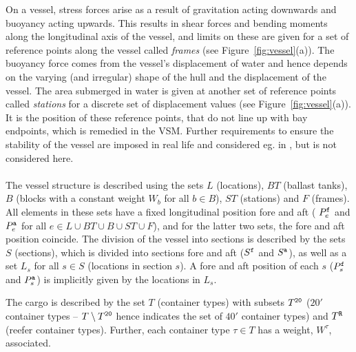 On a vessel, stress forces arise as a result of gravitation acting downwards and buoyancy acting upwards. This results in shear forces and bending moments along the longitudinal axis of the vessel, and limits on these are given for a set of reference points along the vessel called \emph{frames} (see Figure~\ref{fig:vessel}(a)). 
%
The buoyancy force comes from the vessel's displacement of water and hence depends on the varying (and irregular) shape of the hull and the displacement of the vessel. The area submerged in water is given at another set of reference points called \emph{stations} for a discrete set of displacement values (see Figure~\ref{fig:vessel}(a)).
It is the position of these reference points, that do not line up with bay endpoints, which is remedied in the VSM.
%
Further requirements to ensure the stability of the vessel are imposed in real life and considered eg. in \cite{AlbertosThesis}, but is not considered here.
\\\\
The vessel structure is described using the sets $L$ (locations), $BT$ (ballast tanks), $B$ (blocks with a constant weight $W_b$ for all $b\in B$), $ST$ (stations) and $F$ (frames). All elements in these sets have a fixed longitudinal position fore and aft ( $P^{\texttt{f}}_e$ and $P^{\texttt{a}}_e$ for all $e\in L\cup BT \cup B \cup ST \cup F$), and for the latter two sets, the fore and aft position coincide. %
%
The division of the vessel into sections is described by the sets $S$ (sections), which is divided into sections fore and aft ($S^{\texttt{f}}$ and $S^{\texttt{a}}$), as well as a set $L_s$ for all $s\in S$ (locations in section $s$). A fore and aft position of each $s$ ($P^{\texttt{f}}_s$ and $P^{\texttt{a}}_s$) is implicitly given by the locations in $L_s$.%

The cargo is described by the set $T$ (container types) with subsets $T^{\texttt{20}}$ ($20'$ container types -- $T\setminus T^{\texttt{20}}$ hence indicates the set of $40'$ container types) and $T^{\texttt{R}}$ (reefer container types). 
Further, each container type $\tau \in T$ has a weight, $W^\tau$, associated.

